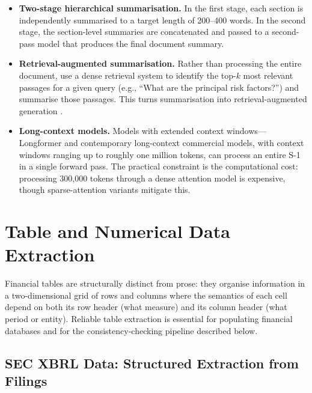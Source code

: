 \begin{itemize}
  \item \textbf{Two-stage hierarchical summarisation.} In the first stage, each section
        is independently summarised to a target length of 200--400 words. In the second
        stage, the section-level summaries are concatenated and passed to a second-pass
        model that produces the final document summary.
  \item \textbf{Retrieval-augmented summarisation.} Rather than processing the entire
        document, use a dense retrieval system to identify the top-$k$ most relevant
        passages for a given query (e.g., ``What are the principal risk factors?'') and
        summarise those passages. This turns summarisation into retrieval-augmented
        generation \citep{lewis2020rag}.
  \item \textbf{Long-context models.} Models with extended context windows---Longformer
        \citep{beltagy2020} and contemporary long-context commercial models, with context
        windows ranging up to roughly one million tokens, can process an entire S-1 in a single forward pass. The practical
        constraint is the computational cost: processing 300,000 tokens through a
        dense attention model is expensive, though sparse-attention variants mitigate
        this.
\end{itemize}

\section{Table and Numerical Data Extraction}
\label{sec:ch14-table-numerical-extraction}

Financial tables are structurally distinct from prose: they organise information in a
two-dimensional grid of rows and columns where the semantics of each cell depend on both
its row header (what measure) and its column header (what period or entity). Reliable
table extraction is essential for populating financial databases and for the
consistency-checking pipeline described below.

\subsection{SEC XBRL Data: Structured Extraction from Filings}
\label{sec:ch14-sec-xbrl-data}


